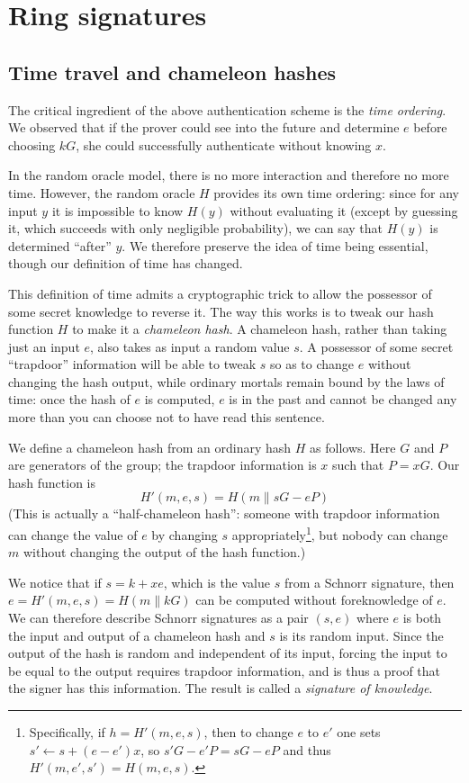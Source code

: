 \documentclass[letterpaper]{article}
\begin{document}
\section{Ring signatures}

\subsection{Time travel and chameleon hashes}

The critical ingredient of the above authentication scheme is the \emph{time
ordering}. We observed that if the prover could see into the future and
determine $e$ before choosing $kG$, she could successfully authenticate
without knowing $x$.

In the random oracle model, there is no more interaction and therefore no
more time. However, the random oracle $H$ provides its own time ordering:
since for any input $y$ it is impossible to know $H(y)$ without evaluating
it (except by guessing it, which succeeds with only negligible probability),
we can say that $H(y)$ is determined ``after'' $y$. We therefore preserve
the idea of time being essential, though our definition of time has changed.

This definition of time admits a cryptographic trick to allow the possessor
of some secret knowledge to reverse it. The way this works is to tweak our
hash function $H$ to make it a \emph{chameleon hash}. A chameleon hash,
rather than taking just an input $e$, also takes as input a random value $s$.
A possessor of some secret ``trapdoor'' information
will be able to tweak $s$ so as to change $e$ without changing the hash output,
while ordinary mortals remain bound by the laws of time: once the hash of
$e$ is computed, $e$ is in the past and cannot be changed any more than
you can choose not to have read this sentence.

We define a chameleon hash from an ordinary hash $H$ as follows. Here
$G$ and $P$ are generators of the group; the trapdoor information is
$x$ such that $P = xG$. Our hash function is
\[ H'(m, e, s) = H(m\|sG - eP) \]
(This is actually a ``half-chameleon hash'': someone with trapdoor information
can change the value of $e$ by changing $s$ appropriately\footnote{Specifically,
if $h = H'(m, e, s)$, then to change $e$ to $e'$ one sets $s'\gets s +
(e - e')x$, so $s'G - e'P = sG - eP$ and thus $H'(m, e', s') = H(m,e,s)$.},
but nobody can change $m$ without changing the output of the hash function.)

We notice that if $s = k + xe$, which is the value $s$ from a Schnorr signature,
then $e = H'(m, e, s) = H(m\|kG)$ can be computed without foreknowledge of $e$.
We can therefore describe Schnorr signatures as a pair $(s, e)$ where $e$ is
both the input and output of a chameleon hash and $s$ is its random input.
Since the output of the hash is random and independent of its input, forcing
the input to be equal to the output requires trapdoor information, and is thus a
proof that the signer has this information.
The result is called a \emph{signature of knowledge}.
\end{document}
